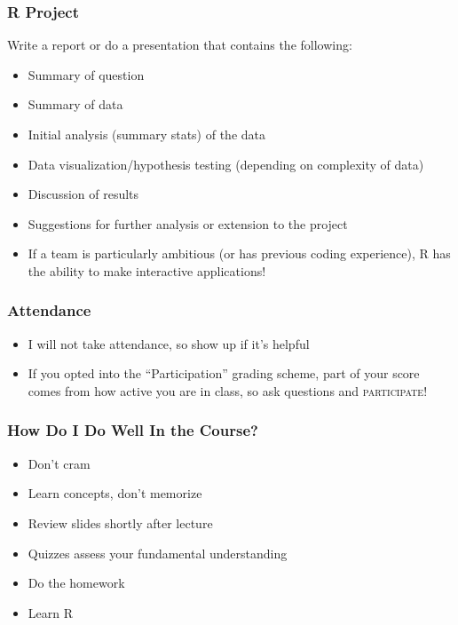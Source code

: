\documentclass{beamer}
\begin{document}
\begin{frame}
\frametitle{R Project}
	Write a report or do a presentation that contains the following:
	\begin{itemize}[<+- | alert@+>]
		\item Summary of question
		\item Summary of data			
		\item Initial analysis (summary stats) of the data
		\item Data visualization/hypothesis testing (depending on complexity of data)
		\item Discussion of results
		\item Suggestions for further analysis or extension to the project
		\item If a team is particularly ambitious (or has previous coding experience), R has the 				ability to make interactive applications!
	\end{itemize}
\end{frame}

\begin{frame}
\frametitle{Attendance}
	\begin{itemize}
		\item I will not take attendance, so show up if it's helpful
		\item If you opted into the ``Participation'' grading scheme, part of your score comes from 			how active you are in class, so ask questions and \alert{\textsc{participate}}!
	\end{itemize}
\end{frame}

\begin{frame}
\frametitle{How Do I Do Well In the Course?}
	\begin{itemize}[<+- | alert@+>]
		\item Don't cram
		\item Learn concepts, don't memorize
		\item Review slides shortly after lecture
		\item Quizzes assess your fundamental understanding
		\item Do the homework
		\item Learn R\alert<7>{\only<7>{, seriously.}}
	\end{itemize}
\end{frame}
\end{document}
